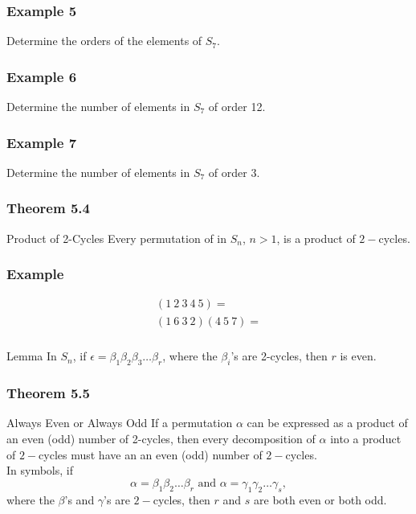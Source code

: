 \documentclass{beamer}
\begin{document}
\begin{frame}
    \frametitle{Example 5}

    Determine the orders of the elements of \(S_7\). 

\end{frame}

\begin{frame}
    \frametitle{Example 6}

    Determine the number of elements in \(S_7\) of order 12. 

\end{frame}

\begin{frame}
    \frametitle{Example 7}

    Determine the number of elements in \(S_7\) of order \(3\). 

\end{frame}

\begin{frame}
    \frametitle{Theorem 5.4}
    \begin{block}{Product of 2-Cycles}
          Every permutation of in \(S_n\), \(n>1\), is a product of \(2-\)cycles.   
    \end{block}

    

\end{frame}

\begin{frame}
    \frametitle{Example }

    \begin{align*}
        (1~2~3~4~5)=\\
        (1~6~3~2)(4~5~7)=
    \end{align*}

\end{frame}

\begin{frame}
    \frametitle{}
\begin{block}{Lemma}
    In \(S_n\), if \(\epsilon = \beta_1\beta_2 \beta_3 \dots \beta_r\), where the \(\beta_i\)'s are 2-cycles, then \(r\) is even. 
\end{block}
    

\end{frame}

\begin{frame}
    \frametitle{Theorem 5.5}

    \begin{block}{Always Even or Always Odd}
        If a permutation \(\alpha\) can be expressed as a product of an even (odd) number of 2-cycles, then every decomposition of \(\alpha\) into a product of \(2-\)cycles must have an an even (odd) number of \(2-\)cycles. \\
        \vspace{0.2in}
        In symbols, if \[\alpha = \beta_1 \beta_2 \dots \beta_r \text{ and } \alpha = \gamma_1 \gamma_2 \dots \gamma_s,\] where the \(\beta\)'s and \(\gamma\)'s are \(2-\)cycles, then \(r\) and \(s\) are both even or both odd.
    \end{block}

\end{frame}
\end{document}
